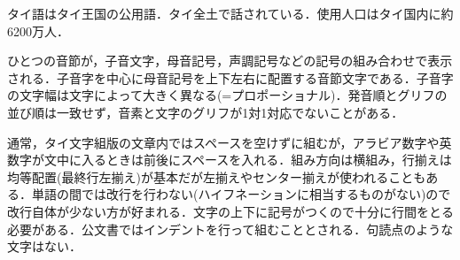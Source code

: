 タイ語はタイ王国の公用語．タイ全土で話されている．使用人口はタイ国内に約6200万人\cite{www.coelang.tufs.ac.jp:mt/th/}．

ひとつの音節が，子音文字，母音記号，声調記号などの記号の組み合わせで表示される．子音字を中心に母音記号を上下左右に配置する音節文字である．子音字の文字幅は文字によって大きく異なる(=プロポーショナル)．発音順とグリフの並び順は一致せず，音素と文字のグリフが1対1対応でないことがある\cite{www.aa.tufs.ac.jp:mmine/lecture/lec03/TLKChar/lecTLK03.htm}．

通常，タイ文字組版の文章内ではスペースを空けずに組むが，アラビア数字や英数字が文中に入るときは前後にスペースを入れる．組み方向は横組み，行揃えは均等配置(最終行左揃え)が基本だが左揃えやセンター揃えが使われることもある．単語の間では改行を行わない(ハイフネーションに相当するものがない)ので改行自体が少ない方が好まれる．文字の上下に記号がつくので十分に行間をとる必要がある．公文書ではインデントを行って組むこととされる．句読点のような文字はない\cite{www.morisawa.co.jp:fonts/multilingual/typesetting/pdf/all_multilingualtypesetting_1802.pdf}．
